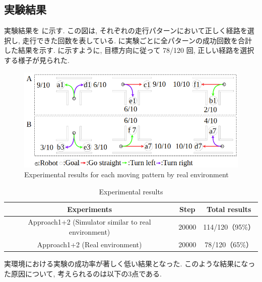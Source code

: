 \subsection{実験結果}
実験結果を  に示す. この図は, それぞれの走行パターンにおいて正しく経路を選択し, 走行できた回数を表している.  に実験ごとに全パターンの成功回数を合計した結果を示す.  に示すように, 目標方向に従って 78/120 回, 正しい経路を選択する様子が見られた.

\begin{figure}[hbtp]
  \centering
 \includegraphics[keepaspectratio, scale=0.5]
      {images/real_result.png}
 \caption{Experimental results for each moving pattern by real environment}
 \label{Fig:real_result}
\end{figure}

\begin{table}[hbtp]
  \caption{Experimental results}
  \label{table:real}
  \centering
  \begin{tabular}{|c|c|c|}
    \hline
    Experiments & Step & Total results\\
    \hline
    Approach1+2 (Simulator similar to real environment) & 20000 & 114/120（95\%）\\
    \hline
    Approach1+2 (Real environment) & 20000 & 78/120（65\%）\\
    \hline
  \end{tabular}
\end{table}

実環境における実験の成功率が著しく低い結果となった. このような結果になった原因について, 考えられるのは以下の3点である.


